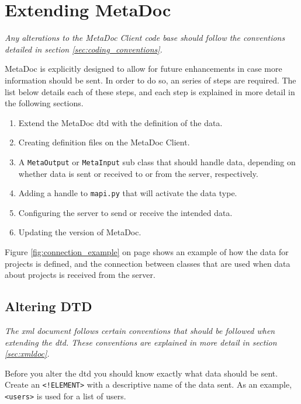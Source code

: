 \newpage
\section{Extending MetaDoc}
\label{sec:extending}
\textit{Any alterations to the MetaDoc Client code base should follow the
conventions detailed in section \ref{sec:coding_conventions}.}

MetaDoc is explicitly designed to allow for future enhancements in case more
information should be sent. In order to do so, an series of steps are required.
The list below details each of these steps, and each step is explained in more
detail in the following sections.

\begin{enumerate}
    \item
        Extend the MetaDoc \gls{dtd} with the definition of the data.
    \item
        Creating definition files on the MetaDoc Client.
    \item
        A \texttt{MetaOutput} or \texttt{MetaInput} sub class that should
        handle data, depending on whether data is sent or received to or from
        the server, respectively.
    \item
        Adding a handle to \texttt{mapi.py} that will activate the data type.
    \item
        Configuring the server to send or receive the intended data.
    \item
        Updating the version of MetaDoc.
\end{enumerate}

Figure \ref{fig:connection_example} on page \pageref{fig:connection_example}
shows an example of how the data for projects is defined, and the connection
between classes that are used when data about projects is received from the
server.


\subsection{Altering DTD}
\textit{The \gls{xml} document follows certain conventions that should be
followed when extending the \gls{dtd}. These conventions are explained in more
detail in section \ref{sec:xmldoc}.}

Before you alter the \gls{dtd} you should know exactly what data should be
sent.  Create an \texttt{<!ELEMENT>} with a descriptive name of the data sent.
As an example, \texttt{<users>} is used for a list of users. 

